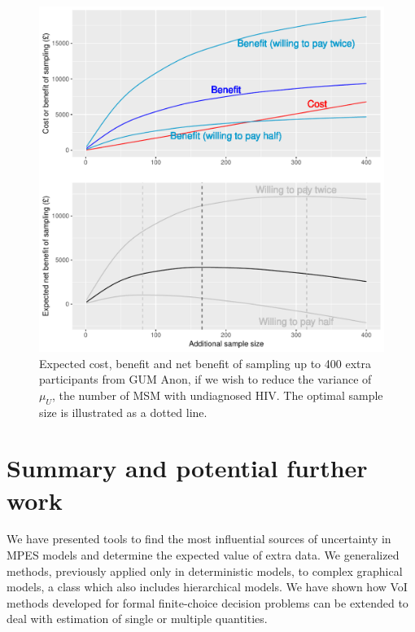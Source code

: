 \documentclass[12pt]{article}\usepackage[]{graphicx}\usepackage[]{color}
\makeatletter
\def\maxwidth{ %
  \ifdim\Gin@nat@width>\linewidth
    \linewidth
  \else
    \Gin@nat@width
  \fi
}
\newenvironment{knitrout}{}{} %
\makeatother
\begin{document}
\begin{figure}[htbp]

\begin{knitrout}
\color{fgcolor}
\includegraphics[width=\maxwidth]{figure/enbs-1} 

\end{knitrout}
  \caption{Expected cost, benefit and net benefit of sampling up to 400 extra participants from GUM Anon, if we wish to reduce the variance of $\mu_U$, the number of MSM with undiagnosed HIV.  The optimal sample size is illustrated as a dotted line.}
  \label{fig:enbs}

\end{figure}


\section{Summary and potential further work}

\label{sec:conc}

We have presented tools to find the most influential sources of uncertainty in MPES models and determine the expected value of extra data.  We generalized methods, previously applied only in deterministic models, to complex graphical models, a class which also includes hierarchical models.   We have shown how VoI methods developed for formal finite-choice decision problems can be extended to deal with estimation of single or multiple quantities.   
\end{document}

